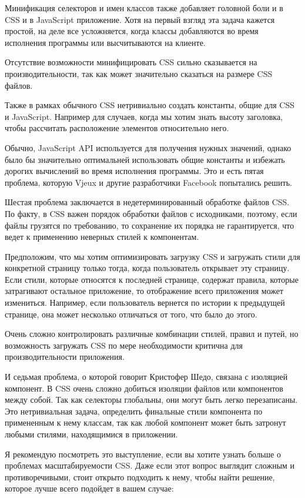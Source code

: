 Минификация селекторов и имен классов также добавляет головной боли и в CSS и в JavaScript приложение. Хотя на первый взгляд эта задача кажется простой, на деле все усложняется, когда классы добавляются во время исполнения программы или высчитываются на клиенте.

Отсутствие возможности минифицировать CSS сильно сказывается на производительности, так как может значительно сказаться на размере CSS файлов.

Также в рамках обычного CSS нетривиально создать константы, общие для CSS и JavaScript. Например для случаев, когда мы хотим знать высоту заголовка, чтобы рассчитать расположение элементов относительно него.

Обычно, JavaScript API используется для получения нужных значений, однако было бы значительно оптимальней использовать общие константы и избежать дорогих вычислений во время исполнения программы. Это и есть пятая проблема, которую Vjeux и другие разработчики Facebook попытались решить.

Шестая проблема заключается в недетерминированный обработке файлов CSS. По факту, в CSS важен порядок обработки файлов с исходниками, поэтому, если файлы грузятся по требованию, то сохранение их порядка не гарантируется, что ведет к применению неверных стилей к компонентам. 

Предположим, что мы хотим оптимизировать загрузку CSS и загружать стили для конкретной страницу только тогда, когда пользователь открывает эту страницу. Если стили, которые относятся к последней странице, содержат правила, которые затрагивают остальное приложение, то отображение всего приложения может измениться. Например, если пользователь вернется по истории к предыдущей странице, она может несколько отличаться от того, что было до этого.

Очень сложно контролировать различные комбинации стилей, правил и путей, но возможность загружать CSS по мере необходимости критична для производительности приложения.

И седьмая проблема, о которой говорит Кристофер Шедо, связана с изоляцией компонент. В CSS очень сложно добиться изоляции файлов или компонентов между собой. Так как селекторы глобальны, они могут быть легко перезаписаны. Это нетривиальная задача, определить финальные стили компонента по примененным к нему классам, так как любой компонент может быть затронут любыми стилями, находящимися в приложении.

Я рекомендую посмотреть это выступление, если вы хотите узнать больше о проблемах масштабируемости CSS. Даже если этот вопрос выглядит сложным и противоречивыми, стоит открыто подходить к нему, чтобы найти решение, которое лучше всего подойдет в вашем случае:

